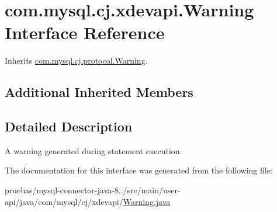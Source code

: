 \hypertarget{interfacecom_1_1mysql_1_1cj_1_1xdevapi_1_1_warning}{}\section{com.\+mysql.\+cj.\+xdevapi.\+Warning Interface Reference}
\label{interfacecom_1_1mysql_1_1cj_1_1xdevapi_1_1_warning}


Inherits \mbox{\hyperlink{interfacecom_1_1mysql_1_1cj_1_1protocol_1_1_warning}{com.\+mysql.\+cj.\+protocol.\+Warning}}.

\subsection*{Additional Inherited Members}


\subsection{Detailed Description}
A warning generated during statement execution. 

The documentation for this interface was generated from the following file\+:\begin{DoxyCompactItemize}
\item 
pruebas/mysql-\/connector-\/java-\/8../src/main/user-\/api/java/com/mysql/cj/xdevapi/\mbox{\hyperlink{user-api_2java_2com_2mysql_2cj_2xdevapi_2_warning_8java}{Warning.\+java}}\end{DoxyCompactItemize}
